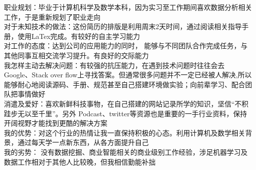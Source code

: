 
\begin{cvparagraph}
\bullet 职业规划：毕业于计算机科学及数学本科，因为实习至工作期间喜欢数据分析相关工作，于是重新规划了职业走向\\
\bullet  对于未知技术的做法：这份简历的排版是利用周末2天时间，通过阅读相关指导手册，使用LaTex完成。有较好的自主学习能力\\
\bullet  对工作的态度：达到公司的应用能力的同时， 能够与不同团队合作完成任务，与其他同事互相交流学习提升。有良好的交际能力\\
\bullet  我怎样主动去解决问题：有较强的抗压能力，在遇到技术问题时往往会去Google、Stack over flow上寻找答案。但通常很多问题并不一定已经被人解决,所以能够耐心地阅读源码、手册、规范甚至自己搭建环境做实验；向前辈学习、配合团队把事情做好\\
\bullet  消遣及爱好：喜欢新鲜科技事物，在自己搭建的网站{\href{http://chenmu1.com/}{\color{deepblue}{Ethan Mu}}记录所学的知识，坚信“不积跬步无以至千里”}。另外 Podcast、twitter等资源也是重要的一手行业资料，保持开阔视野才能找到更酷的解决方案\\
\bullet  我的优势：对这个行业的热情让我一直保持积极的心态。利用计算机及数学相关背景，通过每天学一点新东西，从各方面提升自己\\
\bullet  我的劣势： 没有数据挖掘、商业智能相关的商业级别工作经验，涉足机器学习及数据工作相对于其他人比较晚，但我相信勤能补拙
\end{cvparagraph}



